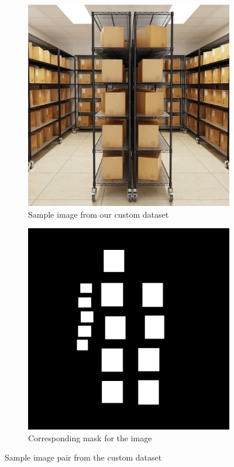 \begin{figure}[h]
      \centering
      \begin{subfigure}[b]{0.45\textwidth}
            \centering
            \includegraphics[width=\textwidth]{assets/dataset/img.jpeg}
            \caption{Sample image from our custom dataset}
      \end{subfigure}
      \hfill
      \begin{subfigure}[b]{0.45\textwidth}
            \centering
            \includegraphics[width=\textwidth]{assets/dataset/mask.jpeg}
            \caption{Corresponding mask for the image}
      \end{subfigure}
      \caption{Sample image pair from the custom dataset}
\end{figure}

